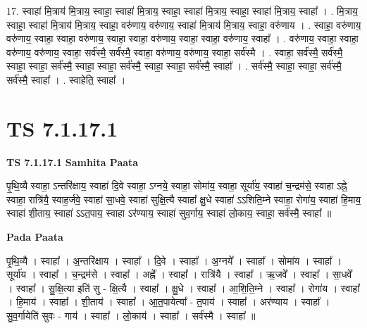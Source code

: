 \documentclass[17pt]{extarticle}
\begin{document}
17. स्वाहा॑ मि॒त्राय॑ मि॒त्राय॒ स्वाहा॒ स्वाहा॑ मि॒त्राय॒ स्वाहा॒ स्वाहा॑ मि॒त्राय॒ स्वाहा॒ स्वाहा॑ मि॒त्राय॒ स्वाहा᳚ । . मि॒त्राय॒ स्वाहा॒ स्वाहा॑ मि॒त्राय॑ मि॒त्राय॒ स्वाहा॒ वरु॑णाय॒ वरु॑णाय॒ स्वाहा॑ मि॒त्राय॑ मि॒त्राय॒ स्वाहा॒ वरु॑णाय । . स्वाहा॒ वरु॑णाय॒ वरु॑णाय॒ स्वाहा॒ स्वाहा॒ वरु॑णाय॒ स्वाहा॒ स्वाहा॒ वरु॑णाय॒ स्वाहा॒ स्वाहा॒ वरु॑णाय॒ स्वाहा᳚ । . वरु॑णाय॒ स्वाहा॒ स्वाहा॒ वरु॑णाय॒ वरु॑णाय॒ स्वाहा॒ सर्व॑स्मै॒ सर्व॑स्मै॒ स्वाहा॒ वरु॑णाय॒ वरु॑णाय॒ स्वाहा॒ सर्व॑स्मै । . स्वाहा॒ सर्व॑स्मै॒ सर्व॑स्मै॒ स्वाहा॒ स्वाहा॒ सर्व॑स्मै॒ स्वाहा॒ स्वाहा॒ सर्व॑स्मै॒ स्वाहा॒ स्वाहा॒ सर्व॑स्मै॒ स्वाहा᳚ । . सर्व॑स्मै॒ स्वाहा॒ स्वाहा॒ सर्व॑स्मै॒ सर्व॑स्मै॒ स्वाहा᳚ । . स्वाहेति॒ स्वाहा᳚ । \newline
\pagebreak
{}

\section{ TS 7.1.17.1 }

\textbf{TS 7.1.17.1 } \newline
\textbf{Samhita Paata} \newline

पृ॒थि॒व्यै स्वाहा॒ ऽन्तरि॑क्षाय॒ स्वाहा॑ दि॒वे स्वाहा॒ ऽग्नये॒ स्वाहा॒ सोमा॑य॒ स्वाहा॒ सूर्या॑य॒ स्वाहा॑ च॒न्द्रम॑से॒ स्वाहा ऽह्ने॒ स्वाहा॒ रात्रि॑यै॒ स्वाह॒र्जवे॒ स्वाहा॑ सा॒धवे॒ स्वाहा॑ सुक्षि॒त्यै स्वाहा᳚ क्षु॒धे स्वाहा॑ ऽऽशिति॒म्ने स्वाहा॒ रोगा॑य॒ स्वाहा॑ हि॒माय॒ स्वाहा॑ शी॒ताय॒ स्वाहा॑ ऽऽत॒पाय॒ स्वाहा ऽर॑ण्याय॒ स्वाहा॑ सुव॒र्गाय॒ स्वाहा॑ लो॒काय॒ स्वाहा॒ सर्व॑स्मै॒ स्वाहा᳚ ॥ \newline

\textbf{Pada Paata} \newline

पृ॒थि॒व्यै । स्वाहा᳚ । अ॒न्तरि॑क्षाय । स्वाहा᳚ । दि॒वे । स्वाहा᳚ । अ॒ग्नये᳚ । स्वाहा᳚ । सोमा॑य । स्वाहा᳚ । सूर्या॑य । स्वाहा᳚ । च॒न्द्रम॑से । स्वाहा᳚ । अह्ने᳚ । स्वाहा᳚ । रात्रि॑यै । स्वाहा᳚ । ऋ॒जवे᳚ । स्वाहा᳚ । सा॒धवे᳚ । स्वाहा᳚ । सु॒क्षि॒त्या इति॑ सु - क्षि॒त्यै । स्वाहा᳚ । क्षु॒धे । स्वाहा᳚ । आ॒शि॒ति॒म्ने । स्वाहा᳚ । रोगा॑य । स्वाहा᳚ । हि॒माय॑ । स्वाहा᳚ । शी॒ताय॑ । स्वाहा᳚ । आ॒त॒पायेत्या᳚ - त॒पाय॑ । स्वाहा᳚ । अर॑ण्याय । स्वाहा᳚ । सु॒व॒र्गायेति॑ सुवः - गाय॑ । स्वाहा᳚ । लो॒काय॑ । स्वाहा᳚ । सर्व॑स्मै । स्वाहा᳚ ॥  \newline
\end{document}
